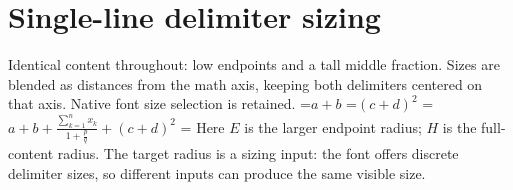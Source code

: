 \documentclass{article}
\newcommand\LeftContent{a+b}
\newcommand\RightContent{(c+d)^2}
\newcommand\Body{\LeftContent+\frac{\displaystyle\sum_{k=1}^{n}x_k}{1+\frac pq}+\RightContent}
\begin{document}
\section*{Single-line delimiter sizing}
Identical content throughout: low endpoints and a tall middle fraction.
Sizes are blended as distances from the math axis, keeping both delimiters
centered on that axis. Native font size selection is retained.
\setbox\leftcontent=\hbox{$\displaystyle\LeftContent$}
\setbox\rightcontent=\hbox{$\displaystyle\RightContent$}
\setbox\fullcontent=\hbox{$\displaystyle\Body$}
\mathaxis=\Umathaxis\displaystyle
{}
\medskip\noindent
Here $E$ is the larger endpoint radius; $H$ is the full-content radius.
The target radius is a sizing input: the font offers discrete delimiter sizes,
so different inputs can produce the same visible size.
\end{document}
